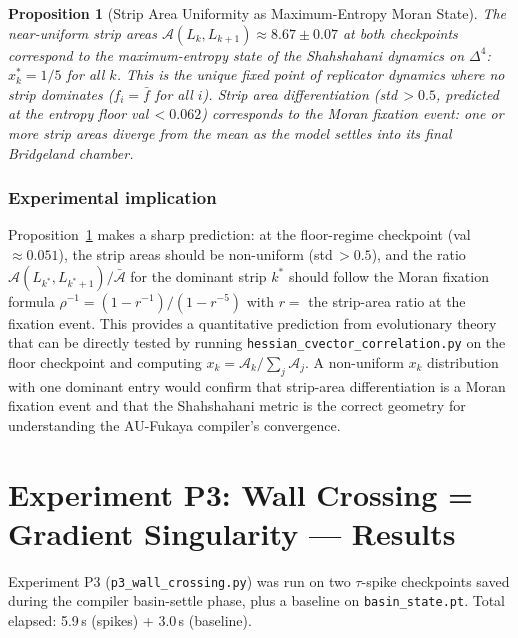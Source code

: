 \documentclass[11pt]{amsart}
\newtheorem{proposition}[theorem]{Proposition}
\begin{document}
\begin{proposition}[Strip Area Uniformity as Maximum-Entropy Moran State]
\label{prop:strip_entropy}
The near-uniform strip areas $\mathcal{A}(L_k, L_{k+1}) \approx
8.67 \pm 0.07$ at both checkpoints correspond to the maximum-entropy
state of the Shahshahani dynamics on $\Delta^4$:
$x_k^* = 1/5$ for all $k$.
This is the unique fixed point of replicator dynamics where no
strip dominates ($f_i = \bar{f}$ for all $i$).
Strip area differentiation (std\,$> 0.5$, predicted at the entropy
floor val\,$< 0.062$) corresponds to the Moran fixation event:
one or more strip areas diverge from the mean as the model settles
into its final Bridgeland chamber.
\end{proposition}

\subsubsection*{Experimental implication}

Proposition~\ref{prop:strip_entropy} makes a sharp prediction:
at the floor-regime checkpoint (val\,$\approx 0.051$), the strip areas
should be non-uniform (std\,$> 0.5$), and the ratio
$\mathcal{A}(L_{k^*}, L_{k^*+1}) / \bar{\mathcal{A}}$ for the
dominant strip $k^*$ should follow the Moran fixation formula
$\rho^{-1} = (1 - r^{-1})/(1 - r^{-5})$
with $r = $ the strip-area ratio at the fixation event.
This provides a quantitative prediction from evolutionary theory that
can be directly tested by running
\texttt{hessian\_cvector\_correlation.py} on the floor checkpoint
and computing $x_k = \mathcal{A}_k / \sum_j \mathcal{A}_j$.
A non-uniform $x_k$ distribution with one dominant entry would
confirm that strip-area differentiation is a Moran fixation event
and that the Shahshahani metric is the correct geometry for
understanding the AU-Fukaya compiler's convergence.

\section{Experiment P3: Wall Crossing = Gradient Singularity --- Results}
\label{sec:p3_results}

Experiment P3 (\texttt{p3\_wall\_crossing.py}) was run on two
$\tau$-spike checkpoints saved during the compiler basin-settle
phase, plus a baseline on \texttt{basin\_state.pt}.
Total elapsed: 5.9\,s (spikes) + 3.0\,s (baseline).
\end{document}
